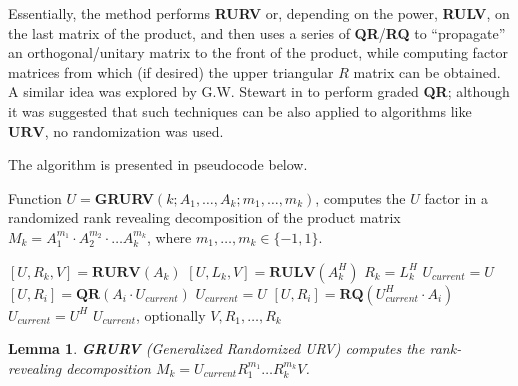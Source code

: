 \documentclass{article}
\newtheorem{lemma}[theorem]{Lemma}
\theoremstyle{definition}
\begin{document}
Essentially, the method performs \textbf{RURV} or, depending on the power, \textbf{RULV}, on the last matrix of the product, and then uses a series of \textbf{QR}/\textbf{RQ} to ``propagate'' an orthogonal/unitary matrix to the front of the product, while computing factor matrices from which (if desired) the upper triangular $R$ matrix can be obtained. A similar idea was explored by G.W. Stewart in \cite{Stewart95} to perform graded \textbf{QR}; although it was suggested that such techniques can be also applied to algorithms like $\textbf{URV}$, no randomization was used. 

The algorithm is presented in pseudocode below. 

\begin{algorithm}
\protect\caption{Function $U =$\textbf{GRURV}$(k; A_1, \ldots, A_k; m_1, \ldots, m_k)$, computes the $U$ factor in a randomized rank revealing decomposition of the product matrix $M_k = A_1^{m_1} \cdot A_2^{m_2} \cdot \ldots A_k^{m_k}$, where $m_1, \ldots, m_k \in \{-1,1\}$.} 
\label{grurv}\begin{algorithmic}[1]
\STATE $[U,R_k,V] = \textbf{RURV}(A_k)$
\ELSE
\STATE $[U,L_k,V] = \textbf{RULV}(A_k^{H})$
\STATE $R_k =L_k^{H}$ 
\ENDIF
\STATE $U_{current} = U$
\STATE $[U,R_i] = \textbf{QR}(A_i \cdot U_{current})$
\STATE $U_{current} = U$
\ELSE 
\STATE $[U,R_i] = \textbf{RQ}(U_{current}^{H} \cdot A_i)$
\STATE $U_{current} = U^H$
\ENDIF
\ENDFOR
\RETURN $U_{current}$, optionally $V, R_1, \ldots, R_k$
\end{algorithmic}
\end{algorithm}

\begin{lemma}
\textbf{GRURV} (\emph{Generalized Randomized URV}) computes the rank-revealing decomposition $M_k = U_{current}R_1^{m_1} \ldots R_k^{m_k} V$. 
\end{lemma}
\end{document}
